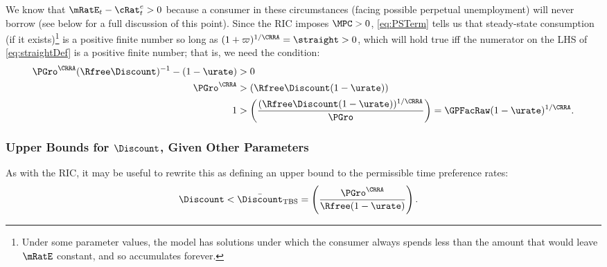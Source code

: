 \documentclass{handout}
\begin{document}
We know that $\mRatE_{t}-{\cRat}^{e}_{t} > 0$ because a consumer in these
circumstances (facing possible perpetual unemployment) will never
borrow (see below for a full discussion of this point). 
Since the RIC imposes $\MPCU>0$, \eqref{eq:PSTerm} tells
us that steady-state consumption (if it exists)\footnote{Under some parameter values, the model has solutions under which the consumer always spends less than the amount that would leave $\mRatE$ constant, and so accumulates forever.} is a positive finite number so long as $(1+\varpi)^{1/\CRRA}=\straight > 0$, which will hold true iff the numerator on the LHS of
\eqref{eq:straightDef} is a positive finite number; that is, we need the
condition:
\begin{equation}\begin{gathered}\begin{aligned}
        \PGro^{\CRRA}(\Rfree\Discount)^{-1}-(1-\urate) & >  0  \\
       \PGro^{\CRRA} & >  (\Rfree \Discount (1-\urate))
\\     1 & >  \left(\frac{(\Rfree \Discount (1-\urate))^{1/\CRRA}}{\PGro}\right) = \GPFacRaw (1-\urate)^{1/\CRRA} 
  \label{eq:GICExistsSoln} %
.\end{aligned}\end{gathered}\end{equation}

\hypertarget{GIFMax}{}\hypertarget{DiscountMaxGICTBS}{}

\subsubsection{Upper Bounds for $\Discount$, Given Other Parameters}


As with the RIC, it may be useful to rewrite this as defining an upper bound to the permissible time preference rates: \providecommand{\DiscountMaxGICTBS}{\bar{\Discount}_{\text{TBS}}}
\begin{equation}\begin{gathered}\begin{aligned}
\Discount < \DiscountMaxGICTBS & =  \left(\frac{\PGro^{\CRRA}}{\Rfree(1-\urate)}\right) \label{eq:DiscountMaxGICTBS}
.
\end{aligned}\end{gathered}\end{equation}
\end{document}
